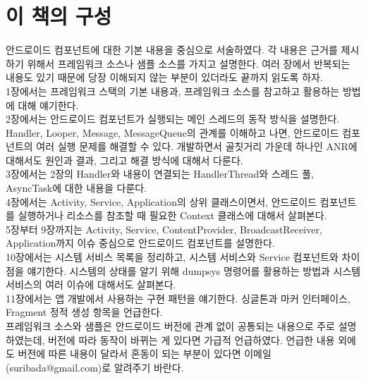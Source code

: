 \begin{comment}
\begin{abstract}
잘 만든 앱은 다 그럭저럭이지만, 그렇지 않은 앱은 제각각의 이유가 있다. 여기서는 그럭저럭한 앱을 만드는 원리와 방법을 찾아보고, 문제를 발생시키는 제각각의 이유에 대해서도 얘기해보자.
\end{abstract}
\end{comment}

\chapter*{이 책의 구성}
안드로이드 컴포넌트에 대한 기본 내용을 중심으로 서술하였다. 각 내용은 근거를 제시하기 위해서 프레임워크 소스나 샘플 소스를 가지고 설명한다.
여러 장에서 반복되는 내용도 있기 때문에 당장 이해되지 않는 부분이 있더라도 끝까지 읽도록 하자.\\

1장에서는 프레임워크 스택의 기본 내용과, 프레임워크 소스를 참고하고 활용하는 방법에 대해 얘기한다.\\

2장에서는 안드로이드 컴포넌트가 실행되는 메인 스레드의 동작 방식을 설명한다.
Handler, Looper, Message, MessageQueue의 관계를 이해하고 나면, 안드로이드 컴포넌트의 여러 실행 문제를 해결할 수 있다. 
개발하면서 골칫거리 가운데 하나인 ANR에 대해서도 원인과 결과, 그리고 해결 방식에 대해서 다룬다.\\

3장에서는 2장의 Handler와 내용이 연결되는 HandlerThread와 스레드 풀, AsyncTask에 대한 내용을 다룬다.\\

4장에서는 Activity, Service, Application의 상위 클래스이면서, 안드로이드 컴포넌트를 실행하거나 리소스를 참조할 때 필요한 Context 클래스에 대해서 살펴본다.\\

5장부터 9장까지는 Activity, Service, ContentProvider, BroadcastReceiver, Application까지 이슈 중심으로 안드로이드 컴포넌트를 설명한다.\\

10장에서는 시스템 서비스 목록을 정리하고, 시스템 서비스와 Service 컴포넌트와 차이점을 얘기한다. 시스템의 상태를 알기 위해 dumpsys 명령어를 활용하는 방법과 시스템 서비스의 여러 이슈에 대해서도 살펴본다.\\

11장에서는 앱 개발에서 사용하는 구현 패턴을 얘기한다. 싱글톤과 마커 인터페이스, Fragment 정적 생성 항목을 언급한다.\\

프레임워크 소스와 샘플은 안드로이드 버전에 관계 없이 공통되는 내용으로 주로 설명하였는데, 버전에 따라 동작이 바뀌는 게 있다면 가급적 언급하였다. 
언급한 내용 외에도 버전에 따른 내용이 달라서 혼동이 되는 부분이 있다면 이메일(suribada@gmail.com)로 알려주기 바란다.

